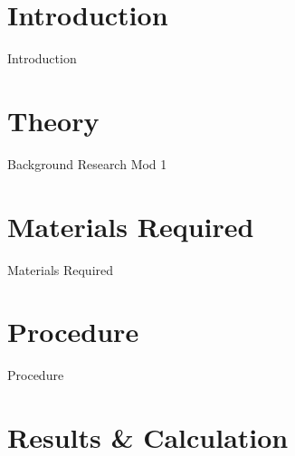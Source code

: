 \documentclass[12pt, a4paper]{report}
\begin{document}
\maketitle

\tableofcontents
\clearpage






\chapter{{Introduction}}
        
        {Introduction}  
        
\chapter{{Theory}}
        
        {Background Research Mod 1}
        
\chapter{{Materials Required}}
        
        {Materials Required}
        
\chapter{{Procedure}}
        
        {Procedure}
        
        



\chapter{{Results \& Calculation}}
\end{document}
